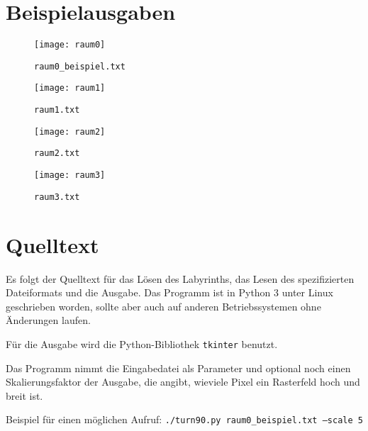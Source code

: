 \documentclass{scrartcl}
\newcommand{\src}[1]{\texttt{#1}}
\begin{document}
\section{Beispielausgaben}
\begin{figure}
	\center\texttt{[image: raum0]}
	\caption{\src{raum0\_beispiel.txt}}
\end{figure}

\begin{figure}
	\center\texttt{[image: raum1]}
	\caption{\src{raum1.txt}}
\end{figure}

\begin{figure}
	\center\texttt{[image: raum2]}
	\caption{\src{raum2.txt}}
\end{figure}

\begin{figure}
	\texttt{[image: raum3]}
	\caption{\src{raum3.txt}}
\end{figure}

\newpage\appendix
\section{Quelltext}
Es folgt der Quelltext für das Lösen des Labyrinths, das Lesen des
spezifizierten Dateiformats und die Ausgabe. Das Programm ist in Python 3 unter
Linux geschrieben worden, sollte aber auch auf anderen Betriebssystemen ohne
Änderungen laufen.

Für die Ausgabe wird die Python-Bibliothek \src{tkinter} benutzt.

Das Programm nimmt die Eingabedatei als Parameter und optional noch einen
Skalierungsfaktor der Ausgabe, die angibt, wieviele Pixel ein Rasterfeld hoch
und breit ist.

Beispiel für einen möglichen Aufruf: \src{./turn90.py raum0\_beispiel.txt %
--scale 5}
\end{document}
